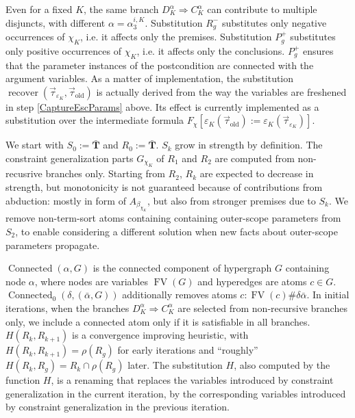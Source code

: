 \documentclass{article}
\newcommand{\assign}{:=}
\newcommand{\tmmathbf}[1]{\ensuremath{\boldsymbol{#1}}}
\newcommand{\tmop}[1]{\ensuremath{\operatorname{#1}}}
\begin{document}
Even for a fixed $K$, the same branch $D_K^{\alpha} \Rightarrow C_K^{\alpha}$
can contribute to multiple disjuncts, with different $\alpha = \alpha_3^{i,
K}$. Substitution $R_g^-$ substitutes only negative occurrences of $\chi_K$,
i.e. it affects only the premises. Substitution $P_g^+$ substitutes only
positive occurrences of $\chi_K$, i.e. it affects only the conclusions.
$P_g^+$ ensures that the parameter instances of the postcondition are
connected with the argument variables. As a matter of implementation, the
substitution $\tmop{recover} (\vec{\tau}_{\varepsilon_K},
\vec{\tau}_{\tmop{old}})$ is actually derived from the way the variables are
freshened in step \ref{CaptureEscParams} above. Its effect is currently
implemented as a substitution over the intermediate formula $F_{\chi}
[\varepsilon_K (\vec{\tau}_{\tmop{old}}) \assign \varepsilon_K
(\vec{\tau}_{\varepsilon_K})]$.

We start with $S_0 \assign \bar{\tmmathbf{T}}$ and $R_0 \assign
\bar{\tmmathbf{T}}$. $S_k$ grow in strength by definition. The constraint
generalization parts $G_{\chi_K}$ of $R_1$ and $R_2$ are computed from
non-recusrive branches only. Starting from $R_2$, $R_k$ are expected to
decrease in strength, but monotonicity is not guaranteed because of
contributions from abduction: mostly in form of $A_{\beta_{\chi_K}}$, but also
from stronger premises due to $S_k$. We remove non-term-sort atoms containing
containing outer-scope parameters from $S_2$, to enable considering a
different solution when new facts about outer-scope parameters propagate.

$\tmop{Connected} (\alpha, G)$ is the connected component of hypergraph $G$
containing node $\alpha$, where nodes are variables $\tmop{FV} (G)$ and
hyperedges are atoms $c \in G$. $\tmop{Connected}_0 (\delta, (\bar{\alpha},
G))$ additionally removes atoms $c : \tmop{FV} (c) \# \delta \bar{\alpha}$. In
initial iterations, when the branches $D_K^{\alpha} \Rightarrow C_K^{\alpha}$
are selected from non-recursive branches only, we include a connected atom
only if it is satisfiable in all branches. $H (R_k, R_{k + 1})$ is a
convergence improving heuristic, with $H (R_k, R_{k + 1}) = \rho (R_g)$ for
early iterations and ``roughly'' $H (R_k, R_g) = R_k \cap \rho (R_g)$ later.
The substitution $H$, also computed by the function $H$, is a renaming that
replaces the variables introduced by constraint generalization in the current
iteration, by the corresponding variables introduced by constraint
generalization in the previous iteration.
\end{document}
